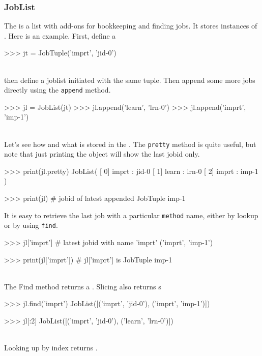 \subsubsection{JobList}

\label{sec:joblist}
The \joblist is a list with add-ons for bookkeeping and finding jobs.
It stores instances of \jobtuple.  Here is an example.  First, define
a \jobtuple

\begin{pythonBEG}
>>> jt = JobTuple('imprt', 'jid-0')
\end{pythonBEG}
\\
then define a joblist initiated with the same tuple.  Then append some
more jobs directly using the \texttt{append} method.

\begin{pythonMID}
>>> jl = JobList(jt)
>>> jl.append('learn', 'lrn-0')
>>> jl.append('imprt', 'imp-1')
\end{pythonMID}
\\
Let's see how and what is stored in the \joblist.  The \texttt{pretty}
method is quite useful, but note that just printing the object will
show the last jobid only.

\begin{pythonMID}
>>> print(jl.pretty)
JobList(
   [  0]  imprt : jid-0
   [  1]  learn : lrn-0
   [  2]  imprt : imp-1
)

>>>  print(jl)  # jobid of latest appended JobTuple
imp-1
\end{pythonMID}

It is easy to retrieve the last job with a particular \texttt{method}
name, either by lookup or by using \texttt{find}.

\begin{pythonMID}
>>> jl['imprt']         # latest jobid with name 'imprt'
('imprt', 'imp-1')

>>> print(jl['imprt'])   # jl['imprt'] is JobTuple
imp-1
\end{pythonMID}
\\
The Find method returns a \joblist.  Slicing also returns {\joblist}s

\begin{pythonMID}
>>> jl.find('imprt')
JobList([('imprt', 'jid-0'), ('imprt', 'imp-1')])

>>> jl[:2]
JobList([('imprt', 'jid-0'), ('learn', 'lrn-0')])
\end{pythonMID}
\\
Looking up by index returns \jobtuple.

